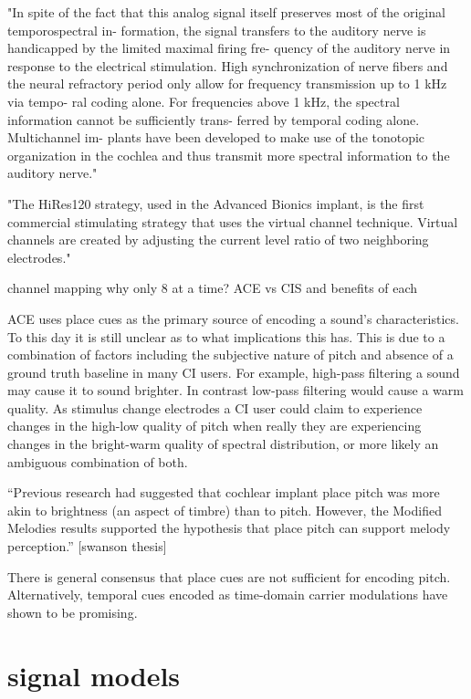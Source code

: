 \documentclass [11pt, proquest] {uwthesis}[2015/03/03]
\begin{document}
"In spite of the fact that this analog signal itself preserves most of the original temporospectral in- formation, the signal transfers to the auditory nerve is handicapped by the limited maximal firing fre- quency of the auditory nerve in response to the electrical stimulation. High synchronization of nerve fibers and the neural refractory period only allow for frequency transmission up to 1 kHz via tempo- ral coding alone. For frequencies above 1 kHz, the spectral information cannot be sufficiently trans- ferred by temporal coding alone. Multichannel im- plants have been developed to make use of the tonotopic organization in the cochlea and thus transmit more spectral information to the auditory nerve." \cite{somek2006coding}


"The HiRes120 strategy, used in the Advanced Bionics implant, is the first commercial stimulating strategy that uses the virtual channel technique. Virtual channels are created by adjusting the current level ratio of two neighboring electrodes."

channel mapping
	why only 8 at a time?
	ACE vs CIS and benefits of each
	
	
	
	ACE uses place cues as the primary source of encoding a sound's characteristics.  To this day it is still unclear as to what implications this has.  This is due to a combination of factors including the subjective nature of pitch and absence of a ground truth baseline in many CI users.  For example, high-pass filtering a sound may cause it to sound brighter.  In contrast low-pass filtering would cause a warm quality.  As stimulus change electrodes a CI user could claim to experience changes in the high-low quality of pitch when really they are experiencing changes in the bright-warm quality of spectral distribution, or more likely an ambiguous combination of both.

``Previous research had suggested that cochlear implant place pitch was more akin to brightness (an aspect of timbre) than to pitch. However, the Modified Melodies results supported the hypothesis that place pitch can support melody perception.'' [swanson thesis]

There is general consensus that place cues are not sufficient for encoding pitch.  Alternatively, temporal cues encoded as time-domain carrier modulations have shown to be promising.

\section{signal models}
\end{document}
